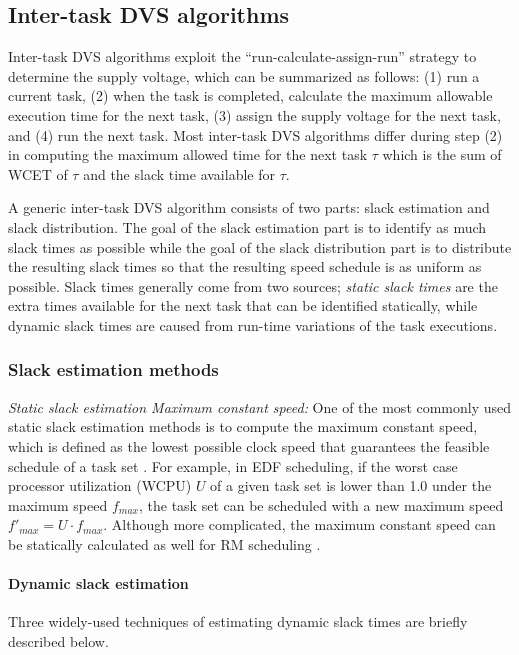 \documentclass[10pt,article]{IEEEtran}
\begin{document}
\subsection{Inter-task DVS algorithms}
Inter-task DVS algorithms exploit the ``run-calculate-assign-run'' strategy to determine the supply voltage, which can be summarized as follows: (1) run a current task, (2) when the task is completed, calculate the maximum allowable execution time for the next task, (3) assign the supply voltage for the next task, and (4) run the next task.  Most inter-task DVS algorithms differ during step (2) in computing the maximum allowed time for the next task $\tau$ which is the sum of WCET of $\tau$ and the slack time available for $\tau$.

A generic inter-task DVS algorithm consists of two parts: slack estimation and slack distribution.  The goal of the slack estimation part is to identify as much slack times as possible while the goal of the slack distribution part is to distribute the resulting slack times so that the resulting speed schedule is as uniform as possible. Slack times generally come from two sources; \emph{static slack times} are the extra times available for the next task that can be identified statically, while {dynamic slack times} are caused from run-time variations of the task executions.

\subsubsection{Slack estimation methods}
\emph{Static slack estimation Maximum constant speed:} One of the most commonly used static slack estimation methods is to compute the maximum constant speed, which is defined as the lowest possible clock speed that guarantees the feasible schedule of a task set \cite{shin}.  For example, in EDF scheduling, if the worst case  processor utilization (WCPU) $U$ of a given task set is lower than 1.0 under the maximum speed $f_{max}$, the task set can be scheduled with a new maximum speed $f'_{max} = U \cdot f_{max}$. Although more complicated, the maximum constant speed can be statically calculated as well for RM scheduling \cite{shin, gruian}.


\paragraph{Dynamic slack estimation}
Three  widely-used  techniques  of  estimating  dynamic slack times are briefly described below. 
\end{document}
